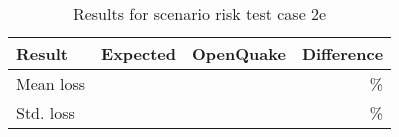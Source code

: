 \begin{table}[htbp]

\centering
\begin{tabular}{ l r r r }

\hline
\rowcolor{anti-flashwhite}
\bf{Result} & \bf{Expected} & \bf{OpenQuake} & \bf{Difference}\\
\hline
Mean loss &  &  & \% \\
Std. loss &  &  & \% \\
\hline
\end{tabular}

\caption{Results for scenario risk test case 2e}
\label{tab:result-scenario-risk-2e}
\end{table}